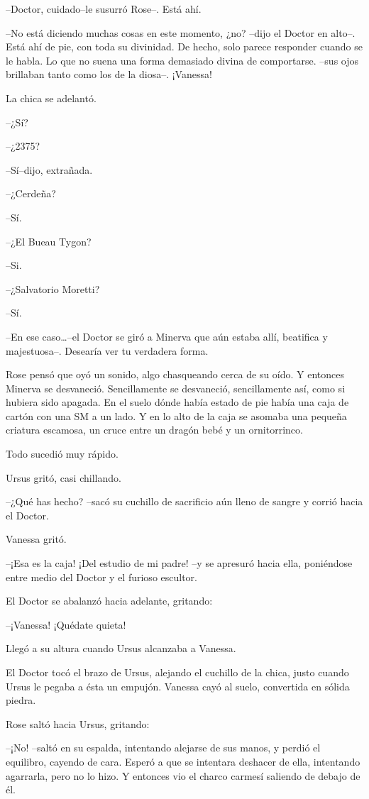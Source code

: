 --Doctor, cuidado--le susurró Rose--. Está ahí.

--No está diciendo muchas cosas en este momento, ¿no? --dijo el Doctor
en alto--. Está ahí de pie, con toda su divinidad. De hecho, solo parece
responder cuando se le habla. Lo que no suena una forma demasiado divina
de comportarse. --sus ojos brillaban tanto como los de la diosa--.
¡Vanessa!

La chica se adelantó.

--¿Sí?

--¿2375?

--Sí--dijo, extrañada.

--¿Cerdeña?

--Sí.

--¿El Bueau Tygon?

--Si.

--¿Salvatorio Moretti?

--Sí.

--En ese caso\ldots{}--el Doctor se giró a Minerva que aún estaba allí,
beatifica y majestuosa--. Desearía ver tu verdadera forma.

Rose pensó que oyó un sonido, algo chasqueando cerca de su oído. Y
entonces Minerva se desvaneció. Sencillamente se desvaneció,
sencillamente así, como si hubiera sido apagada. En el suelo dónde había
estado de pie había una caja de cartón con una SM a un lado. Y en lo
alto de la caja se asomaba una pequeña criatura escamosa, un cruce entre
un dragón bebé y un ornitorrinco.

Todo sucedió muy rápido.

Ursus gritó, casi chillando.

--¿Qué has hecho? --sacó su cuchillo de sacrificio aún lleno de sangre y
corrió hacia el Doctor.

Vanessa gritó.

--¡Esa es la caja! ¡Del estudio de mi padre! --y se apresuró hacia ella,
poniéndose entre medio del Doctor y el furioso escultor.

El Doctor se abalanzó hacia adelante, gritando:

--¡Vanessa! ¡Quédate quieta!

Llegó a su altura cuando Ursus alcanzaba a Vanessa.

El Doctor tocó el brazo de Ursus, alejando el cuchillo de la chica,
justo cuando Ursus le pegaba a ésta un empujón. Vanessa cayó al suelo,
convertida en sólida piedra.

Rose saltó hacia Ursus, gritando:

--¡No! --saltó en su espalda, intentando alejarse de sus manos, y perdió
el equilibro, cayendo de cara. Esperó a que se intentara deshacer de
ella, intentando agarrarla, pero no lo hizo. Y entonces vio el charco
carmesí saliendo de debajo de él.

